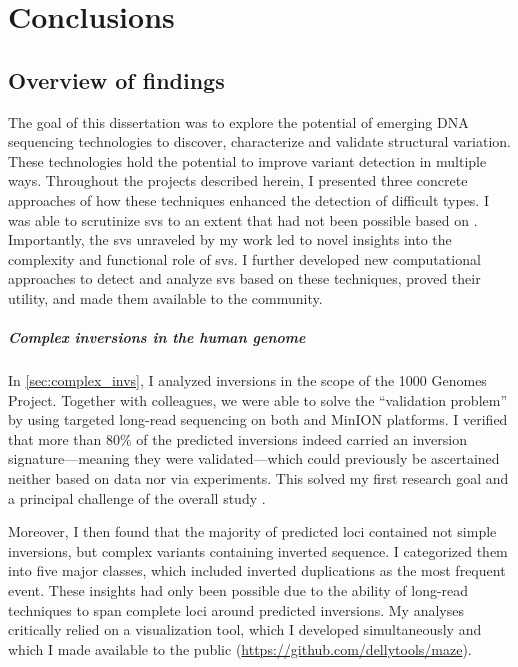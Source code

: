 \chapter{Conclusions}
\label{sec:conclusions}

\section{Overview of findings}
\label{sec:findings}

The goal of this dissertation was to explore the potential of emerging DNA
sequencing technologies to discover, characterize and validate structural
variation. These technologies hold the potential to improve variant detection in
multiple ways. Throughout the projects described herein, I presented three
concrete approaches of how these techniques enhanced the detection of difficult
\sv types. I was able to scrutinize \acp{sv} to an extent that had not been
possible based on \mps. Importantly, the \acp{sv} unraveled by my work
led to novel insights into the complexity and functional role
of \acp{sv}. I further developed new computational approaches to detect and
analyze \acp{sv} based on these techniques, proved their utility, and made
them available to the community.


\paragraph{Complex inversions in the human genome}
In \cref{sec:complex_invs}, I analyzed inversions in the scope of the 1000
Genomes Project. Together with colleagues, we were able to solve the
``validation problem'' by using targeted long-read sequencing on both \pacbio
and \ont MinION platforms. I verified that more than 80\% of the predicted
inversions indeed carried an inversion signature---meaning they were
validated---which could previously be ascertained neither based on \mps data nor
via \pcr experiments. This solved my first research goal and a principal
challenge of the overall study \citep{Sudmant2015}.

Moreover, I then found that
the majority of predicted loci contained not simple inversions, but complex
variants containing inverted sequence. I categorized them into five major
classes, which included inverted duplications as the most frequent event. These
insights had only been possible due to the ability of long-read techniques to
span complete loci around predicted inversions. My analyses critically relied on
a visualization tool, which I developed simultaneously and which I made
available to the public (\url{https://github.com/dellytools/maze}).

